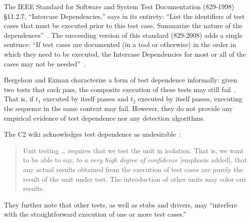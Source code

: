 The IEEE Standard for Software and System Test
Documentation (829-1998) \S 11.2.7, ``Intercase
Dependencies,'' says in its entirety: ``List the identifiers of
test cases that must be executed prior to this test
case. Summarize
the nature of the dependences''~\cite{IEEE:829-1998}.  The succeeding version of this
standard (829-2008) adds a single sentence: ``If
test cases are documented (in a tool or otherwise) in the order in
which they need to be executed, the Intercase Dependencies for most or
all of the cases may not be needed''~\cite{IEEE:829-2008}.





Bergelson and Exman characterize a form of test dependence informally:
given two tests that each pass, the composite
execution of these tests may still
fail~\cite[p.~38]{bergelsonetal:EEE:2006}.  That is, if 
$t_1$ executed by itself passes and $t_2$ executed by itself passes,
executing the sequence  in the same context may fail.
However, they do not provide any empirical evidence of
test dependence nor any detection algorithms.

The C2 wiki acknowledges test dependence as undesirable~\cite{unit-test-def}:
\vspace{-1mm}
\begin{quote}
Unit testing \dots  
requires that we test the unit in isolation. That is, we
want to be able to say, \emph{to a very high degree of confidence} [emphasis added], that
any actual results obtained from the execution of test cases are
purely the result of the unit under test. The introduction of
other units may color our results.
\end{quote}
\vspace{-1mm}
They further note that other tests, as well as stubs and drivers,
may ``interfere with the straightforward
execution of one or more test cases.''


